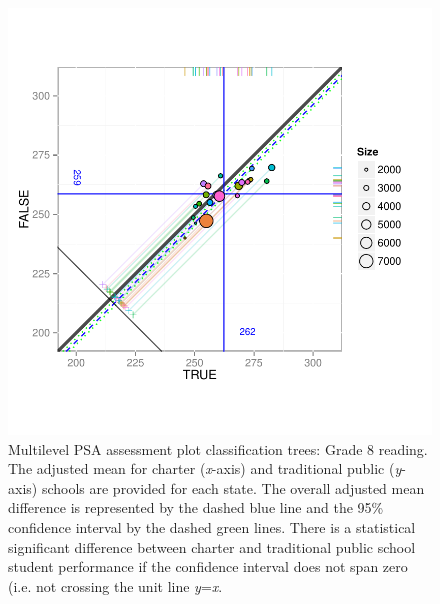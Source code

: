 \begin{figure}[h!]
\begin{center}
\includegraphics[width=\textwidth,trim=0 .6in 0 .6in]{../Figures2009/g8read-mlpsa-ctree-circ.pdf}
\caption[Multilevel PSA assessment plot classification trees: Grade 8 reading]{Multilevel PSA assessment plot classification trees: Grade 8 reading. The adjusted mean for charter (\textit{x}-axis) and traditional public (\textit{y}-axis) schools are provided for each state. The overall adjusted mean difference is represented by the dashed blue line and the 95\% confidence interval by the dashed green lines. There is a statistical significant difference between charter and traditional public school student performance if the confidence interval does not span zero (i.e. not crossing the unit line \textit{y}=\textit{x}.}
\end{center}
\end{figure}

